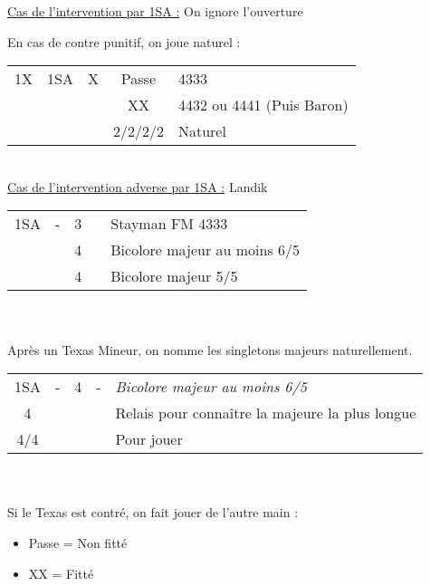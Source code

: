 \documentclass[a4paper, oneside, 11pt]{report}
\begin{document}
	\underline{Cas de l'intervention par 1SA :} On ignore l'ouverture
	
	En cas de contre punitif, on joue naturel :\\
	\begin{tabular}{cccc|l}
	1X & 1SA & X & Passe & 4333\\
	&&& XX & 4432 ou 4441 (Puis Baron)\\
	&&& 2\trefle/2\carreau/2\coeur/2\pique & Naturel\\
	\end{tabular}\\
	
	\underline{Cas de l'intervention adverse par 1SA :} Landik\\

		\begin{tabular}{cccc|l}
		1SA & - & 3\carreau && Stayman FM 4333\\
		&& 4\trefle && Bicolore majeur au moins 6/5\\
		&& 4\carreau && Bicolore majeur 5/5\\
		\end{tabular}\\\\

		Après un Texas Mineur, on nomme les singletons majeurs naturellement.\\

		\begin{tabular}{cccc|l}
		1SA & - & 4\trefle & - & \it{Bicolore majeur au moins 6/5}\\
		4\carreau &&&& Relais pour connaître la majeure la plus longue\\
		4\coeur/4\pique &&&& Pour jouer\\
		\end{tabular}\\\\

		Si le Texas est contré, on fait jouer de l'autre main :
		\begin{itemize}
		\item Passe = Non fitté
		\item XX = Fitté\\
		\end{itemize}
		
\end{document}
